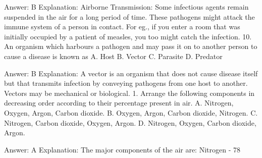 Answer: B
Explanation: Airborne Transmission: Some infectious agents remain suspended in the air for a long period of time. These pathogens might attack the immune system of a person in contact. For eg., if you enter a room that was initially occupied by a patient of measles, you too might catch the infection. 10. An organism which harbours a pathogen and may pass it on to another person to cause a disease is known as A. Host B. Vector C. Parasite D. Predator 

Answer: B
Explanation: A vector is an organism that does not cause disease itself but that transmits infection by conveying pathogens from one host to another. Vectors may be mechanical or biological. 1. Arrange the following components in decreasing order according to their percentage present in air. A. Nitrogen, Oxygen, Argon, Carbon dioxide. B. Oxygen, Argon, Carbon dioxide, Nitrogen. C. Nitrogen, Carbon dioxide, Oxygen, Argon. D. Nitrogen, Oxygen, Carbon dioxide, Argon. 

Answer: A
Explanation: The major components of the air are: Nitrogen - 78%

